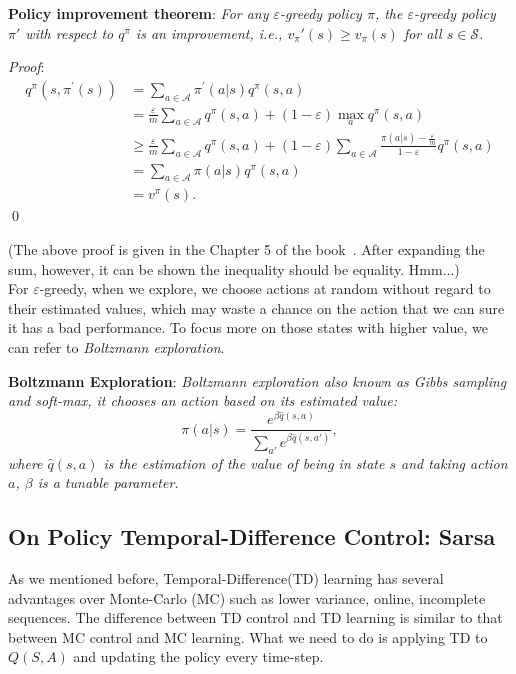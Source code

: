 \documentclass{progartcn}
\begin{document}
			\textbf{Policy improvement theorem}: \textit{For any $\varepsilon$-greedy policy $\pi$, the $\varepsilon$-greedy policy $\pi'$ with respect to $q^\pi$ is an improvement, i.e., $v_\pi'(s)\ge v_\pi(s)$ for all $s\in\mathcal{S}$.}

			\textit{Proof}:
			\begin{align*}
			q^{\pi}\left(s, \pi^{\prime}(s)\right) &=\sum_{a \in \mathcal{A}} \pi^{\prime}(a | s) q^{\pi}(s, a) \\
			&=\frac{\varepsilon}{m} \sum_{a \in \mathcal{A}} q^{\pi}(s, a)+(1-\varepsilon) \max _{a} q^{\pi}(s, a) \\
			& \geq \frac{\varepsilon}{m} \sum_{a \in \mathcal{A}} q^{\pi}(s, a)+(1-\varepsilon) \sum_{a \in \mathcal{A}} \frac{\pi(a | s)-\frac{\varepsilon}{m}}{1-\varepsilon} q^{\pi}(s, a) \tag{1}\\
			&=\sum_{a \in \mathcal{A}} \pi(a | s) q^{\pi}(s, a)\\
			&=v^{\pi}(s).
			\end{align*}
			\qed

			(The above proof is given in the Chapter 5 of the book~\cite{sutton2018reinforcement}. After expanding the sum, however, it can be shown the inequality should be equality. Hmm...)\\

			For $\varepsilon$-greedy, when we explore, we choose actions at random without regard to their estimated values, which may waste a chance on the action that we can sure it has a bad performance. To focus more on those states with higher value, we can refer to \textit{Boltzmann exploration}.

			\textbf{Boltzmann Exploration}: \textit{Boltzmann exploration also known as Gibbs sampling and soft-max, it chooses an action based on its estimated value:}
			\[\pi(a|s)=\frac{e^{\beta\hat q(s,a)}}{\sum_{a'}e^{\beta\hat q(s,a')}},\]
			\textit{where $\hat q(s,a)$ is the estimation of the value of being in state $s$ and taking action $a$, $\beta$ is a tunable parameter.}\\

		\subsection{On Policy Temporal-Difference Control: Sarsa}

			As we mentioned before, Temporal-Difference(TD) learning has several advantages over Monte-Carlo (MC) such as lower variance, online, incomplete sequences. The difference between TD control and TD learning is similar to that between MC control and MC learning. What we need to do is applying TD to $Q(S,A)$ and updating the policy every time-step.\\
\end{document}

